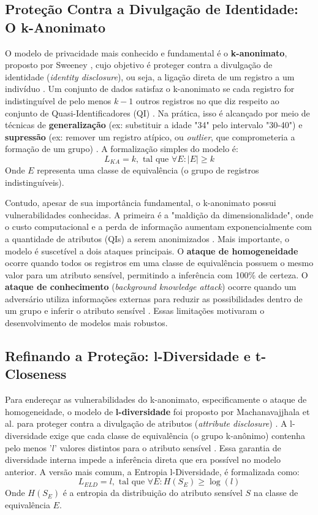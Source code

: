 \subsection{Proteção Contra a Divulgação de Identidade: O k-Anonimato}
\label{subsec:fund-k-anonimato}

O modelo de privacidade mais conhecido e fundamental é o \textbf{k-anonimato}, proposto por Sweeney \cite{Sweeney2002}, cujo objetivo é proteger contra a divulgação de identidade (\textit{identity disclosure}), ou seja, a ligação direta de um registro a um indivíduo \cite{Sepas2022, Vovk2023}. Um conjunto de dados satisfaz o k-anonimato se cada registro for indistinguível de pelo menos $k-1$ outros registros no que diz respeito ao conjunto de Quasi-Identificadores (QI) \cite{Zuo2021Data, Olatunji2024}. Na prática, isso é alcançado por meio de técnicas de \textbf{generalização} (ex: substituir a idade "34" pelo intervalo "30-40") e \textbf{supressão} (ex: remover um registro atípico, ou \textit{outlier}, que comprometeria a formação de um grupo) \cite{Sepas2022}. A formalização simples do modelo é:
$$L_{KA} = k, \text{ tal que } \forall E : |E| \geq k$$
Onde $E$ representa uma classe de equivalência (o grupo de registros indistinguíveis).

Contudo, apesar de sua importância fundamental, o k-anonimato possui vulnerabilidades conhecidas. A primeira é a "maldição da dimensionalidade", onde o custo computacional e a perda de informação aumentam exponencialmente com a quantidade de atributos (QIs) a serem anonimizados \cite{Zuo2021Data}. Mais importante, o modelo é suscetível a dois ataques principais. O \textbf{ataque de homogeneidade} ocorre quando todos os registros em uma classe de equivalência possuem o mesmo valor para um atributo sensível, permitindo a inferência com 100\% de certeza. O \textbf{ataque de conhecimento} (\textit{background knowledge attack}) ocorre quando um adversário utiliza informações externas para reduzir as possibilidades dentro de um grupo e inferir o atributo sensível \cite{Zuo2021Data, Vovk2023}. Essas limitações motivaram o desenvolvimento de modelos mais robustos.

\subsection{Refinando a Proteção: l-Diversidade e t-Closeness}
\label{subsec:fund-l-diversidade}

Para endereçar as vulnerabilidades do k-anonimato, especificamente o ataque de homogeneidade, o modelo de \textbf{l-diversidade} foi proposto por Machanavajjhala et al. \cite{Machanavajjhala2007} para proteger contra a divulgação de atributos (\textit{attribute disclosure}) \cite{Sepas2022}. A l-diversidade exige que cada classe de equivalência (o grupo k-anônimo) contenha pelo menos '$l$' valores distintos para o atributo sensível \cite{Zuo2021Data, Olatunji2024}. Essa garantia de diversidade interna impede a inferência direta que era possível no modelo anterior. A versão mais comum, a Entropia l-Diversidade, é formalizada como:
$$L_{ELD} = l, \text{ tal que } \forall E : H(S_E) \geq \log(l)$$
Onde $H(S_E)$ é a entropia da distribuição do atributo sensível $S$ na classe de equivalência $E$.

